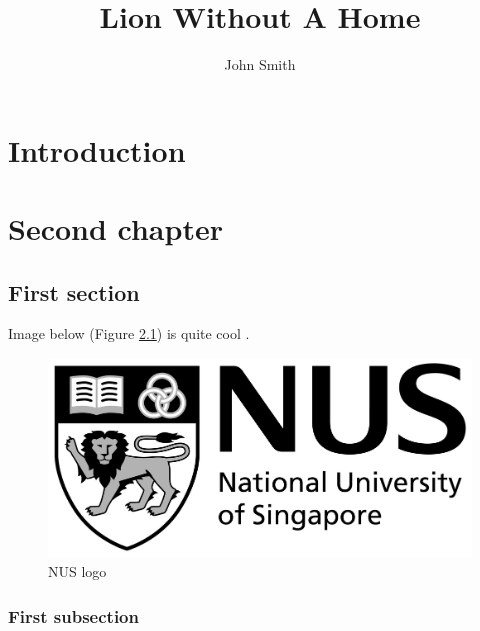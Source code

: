 \documentclass{nus-student-qe}
\author{John Smith}
\title{Lion Without A Home}
\begin{document}
	\maketitle
	\afterpage{\blankpage}
	
	\abstract
	\lipsum[1]
	\thispagestyle{empty}
	
	
	\tableofcontents
	\setcounter{page}{1}
	\pagebreak
	
	\figures
	\tables
	\algorithms
	\pagebreak
	
	\chapter{Introduction}
	\lipsum[1-4]
	
	\chapter{Second chapter}
	\lipsum[1]
	
	\section{First section}
	\lipsum[1]
	
	Image below (Figure \ref{fig:nus-logo}) is quite cool \cite{bellman}.
	
	\begin{figure}[!ht]
		\caption{NUS logo}
		\label{fig:nus-logo}
		\centering
		\includegraphics[scale=0.5]{images/nus-logo}
	\end{figure}
	
	\subsection{First subsection}
	\lipsum[1]
	
\end{document}
